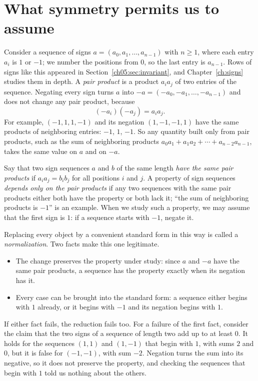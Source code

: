 \section{What symmetry permits us to assume}\label{ch06:sec:wlog}
Consider a sequence of signs $a=(a_0,a_1,\ldots,a_{n-1})$ with $n\ge1$, where each entry $a_i$ is $1$ or $-1$; we number the positions from $0$, so the last entry is $a_{n-1}$. Rows of signs like this appeared in Section~\ref{ch05:sec:invariant}, and Chapter~\ref{ch:signs} studies them in depth. A \emph{pair product} is a product $a_ia_j$ of two entries of the sequence. Negating every sign turns $a$ into $-a=(-a_0,-a_1,\ldots,-a_{n-1})$ and does not change any pair product, because
\[
(-a_i)(-a_j)=a_ia_j.
\]
For example, $(-1,1,1,-1)$ and its negation $(1,-1,-1,1)$ have the same products of neighboring entries: $-1$, $1$, $-1$. So any quantity built only from pair products, such as the sum of neighboring products $a_0a_1+a_1a_2+\cdots+a_{n-2}a_{n-1}$, takes the same value on $a$ and on $-a$.

Say that two sign sequences $a$ and $b$ of the same length \emph{have the same pair products} if $a_ia_j=b_ib_j$ for all positions $i$ and $j$. A property of sign sequences \emph{depends only on the pair products} if any two sequences with the same pair products either both have the property or both lack it; ``the sum of neighboring products is $-1$'' is an example. When we study such a property, we may assume that the first sign is $1$: if a sequence starts with $-1$, negate it.

Replacing every object by a convenient standard form in this way is called a \emph{normalization}. Two facts make this one legitimate.
\begin{itemize}
\item The change preserves the property under study: since $a$ and $-a$ have the same pair products, a sequence has the property exactly when its negation has it.
\item Every case can be brought into the standard form: a sequence either begins with $1$ already, or it begins with $-1$ and its negation begins with $1$.
\end{itemize}
If either fact fails, the reduction fails too. For a failure of the first fact, consider the claim that the two signs of a sequence of length two add up to at least $0$. It holds for the sequences $(1,1)$ and $(1,-1)$ that begin with $1$, with sums $2$ and $0$, but it is false for $(-1,-1)$, with sum $-2$. Negation turns the sum into its negative, so it does not preserve the property, and checking the sequences that begin with $1$ told us nothing about the others.

